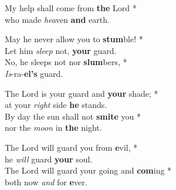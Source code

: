 My help shall come from \textbf{the} Lord *\\
who made \emph{hea}ven \textbf{and} earth.

May he never allow you to \textbf{stum}ble! *\\
Let him \emph{sleep} not, \textbf{your} guard.\\
No, he sleeps not nor \textbf{slum}bers, *\\
\emph{Is}-ra-\textbf{el's} guard.

The Lord is your guard and \textbf{your} shade; *\\
at your \emph{right} side \textbf{he} stands.\\
By day the sun shall not \textbf{smite} you *\\
nor the \emph{moon} in \textbf{the} night.

The Lord will guard you from \textbf{e}vil, *\\
he \emph{will} guard \textbf{your} soul.\\
The Lord will guard your going and \textbf{com}ing *\\
both now \emph{and} for \textbf{e}ver.